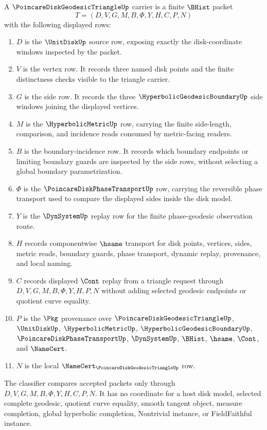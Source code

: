 \begin{definition}
\label{def:poincare-disk-geodesic-triangle-carrier}
A $\PoincareDiskGeodesicTriangleUp$ carrier is a finite $\BHist$ packet
$$
T=(D,V,G,M,B,\Phi,Y,H,C,P,N)
$$
with the following displayed rows:
\begin{enumerate}
\item $D$ is the $\UnitDiskUp$ source row, exposing exactly the disk-coordinate windows inspected by the packet.
\item $V$ is the vertex row. It records three named disk points and the finite distinctness checks visible to the triangle carrier.
\item $G$ is the side row. It records the three $\HyperbolicGeodesicBoundaryUp$ side windows joining the displayed vertices.
\item $M$ is the $\HyperbolicMetricUp$ row, carrying the finite side-length, comparison, and incidence reads consumed by metric-facing readers.
\item $B$ is the boundary-incidence row. It records which boundary endpoints or limiting boundary guards are inspected by the side rows, without selecting a global boundary parametrization.
\item $\Phi$ is the $\PoincareDiskPhaseTransportUp$ row, carrying the reversible phase transport used to compare the displayed sides inside the disk model.
\item $Y$ is the $\DynSystemUp$ replay row for the finite phase-geodesic observation route.
\item $H$ records componentwise $\hsame$ transport for disk points, vertices, sides, metric reads, boundary guards, phase transport, dynamic replay, provenance, and local naming.
\item $C$ records displayed $\Cont$ replay from a triangle request through $D,V,G,M,B,\Phi,Y,H,P,N$ without adding selected geodesic endpoints or quotient curve equality.
\item $P$ is the $\Pkg$ provenance over $\PoincareDiskGeodesicTriangleUp$, $\UnitDiskUp$, $\HyperbolicMetricUp$, $\HyperbolicGeodesicBoundaryUp$, $\PoincareDiskPhaseTransportUp$, $\DynSystemUp$, $\BHist$, $\hsame$, $\Cont$, and $\NameCert$.
\item $N$ is the local $\NameCert_{\PoincareDiskGeodesicTriangleUp}$ row.
\end{enumerate}
The classifier compares accepted packets only through $D,V,G,M,B,\Phi,Y,H,C,P,N$. It has no coordinate for a host disk model, selected complete geodesic, quotient curve equality, smooth tangent object, measure completion, global hyperbolic completion, Nontrivial instance, or FieldFaithful instance.
\end{definition}

